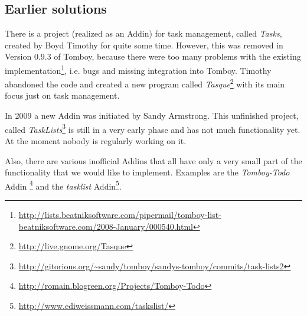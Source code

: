 \subsection{Earlier solutions}
There is a project (realized as an Addin) for task management, called \textit{Tasks}, created by Boyd Timothy for quite some time. However, this was removed in Version 0.9.3 of Tomboy, because there were too many problems with the existing implementation\footnote{\url{http://lists.beatniksoftware.com/pipermail/tomboy-list-beatniksoftware.com/2008-January/000540.html}}, i.e. bugs and missing integration into Tomboy.
Timothy abandoned the code and created a new program called \textit{Tasque}\footnote{\url{http://live.gnome.org/Tasque}} with its main focus just on task management.

In 2009 a new Addin was initiated by Sandy Armstrong. This unfinished project, called \textit{TaskLists}\footnote{\url{http://gitorious.org/~sandy/tomboy/sandys-tomboy/commits/task-lists2}} is still in a very early phase and has not much functionality yet. At the moment nobody is regularly working on it.

Also, there are various inofficial Addins that all have only a very small part of the functionality that we would like to implement. Examples are the \textit{Tomboy-Todo}
Addin \footnote{\url{http://romain.blogreen.org/Projects/Tomboy-Todo}} and the \textit{tasklist} Addin\footnote{\url{http://www.ediweissmann.com/taskslist/}}.